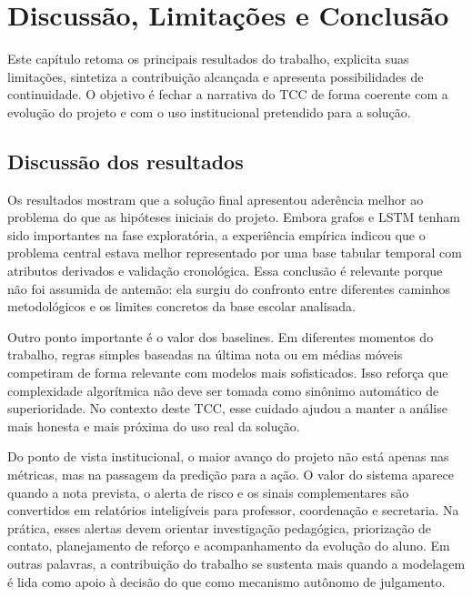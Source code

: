 \chapter{Discuss\~ao, Limita\c{c}\~oes e Conclus\~ao}
\label{cap:conclusao}

Este cap\'itulo retoma os principais resultados do trabalho, explicita suas limita\c{c}\~oes, sintetiza a contribui\c{c}\~ao alcan\c{c}ada e apresenta possibilidades de continuidade. O objetivo \'e fechar a narrativa do TCC de forma coerente com a evolu\c{c}\~ao do projeto e com o uso institucional pretendido para a solu\c{c}\~ao.

\section{Discuss\~ao dos resultados}
\label{sec:discussao}
\label{sec:retomada-problema}
\label{sec:atendimento-objetivos}
\label{sec:principais-contribuicoes}
\label{sec:aspectos-eticos-uso-responsavel}

Os resultados mostram que a solu\c{c}\~ao final apresentou ader\^encia melhor ao problema do que as hip\'oteses iniciais do projeto. Embora grafos e LSTM tenham sido importantes na fase explorat\'oria, a experi\^encia emp\'irica indicou que o problema central estava melhor representado por uma base tabular temporal com atributos derivados e valida\c{c}\~ao cronol\'ogica. Essa conclus\~ao \'e relevante porque n\~ao foi assumida de antem\~ao: ela surgiu do confronto entre diferentes caminhos metodol\'ogicos e os limites concretos da base escolar analisada.

Outro ponto importante \'e o valor dos baselines. Em diferentes momentos do trabalho, regras simples baseadas na \'ultima nota ou em m\'edias m\'oveis competiram de forma relevante com modelos mais sofisticados. Isso refor\c{c}a que complexidade algor\'itmica n\~ao deve ser tomada como sin\^onimo autom\'atico de superioridade. No contexto deste TCC, esse cuidado ajudou a manter a an\'alise mais honesta e mais pr\'oxima do uso real da solu\c{c}\~ao.

Do ponto de vista institucional, o maior avan\c{c}o do projeto n\~ao est\'a apenas nas m\'etricas, mas na passagem da predi\c{c}\~ao para a a\c{c}\~ao. O valor do sistema aparece quando a nota prevista, o alerta de risco e os sinais complementares s\~ao convertidos em relat\'orios intelig\'iveis para professor, coordena\c{c}\~ao e secretaria. Na pr\'atica, esses alertas devem orientar investiga\c{c}\~ao pedag\'ogica, prioriza\c{c}\~ao de contato, planejamento de refor\c{c}o e acompanhamento da evolu\c{c}\~ao do aluno. Em outras palavras, a contribui\c{c}\~ao do trabalho se sustenta mais quando a modelagem \'e lida como apoio \`a decis\~ao do que como mecanismo aut\^onomo de julgamento.

